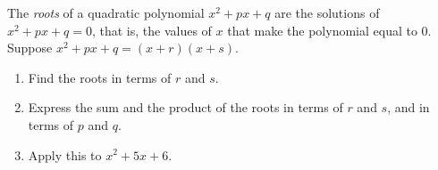 The \emph{roots} of a quadratic polynomial $x^2+px+q$ are the solutions of $x^2+px+q=0$, that is, the values of $x$ that make the polynomial equal to $0$. Suppose $x^2+px+q=(x+r)(x+s)$.
\begin{enumerate}
\item[(a)] Find the roots in terms of $r$ and $s$.
\item[(b)] Express the sum and the product of the roots in terms of $r$ and $s$, and in terms of $p$ and $q$.
\item[(c)] Apply this to $x^2+5x+6$.
\end{enumerate}
